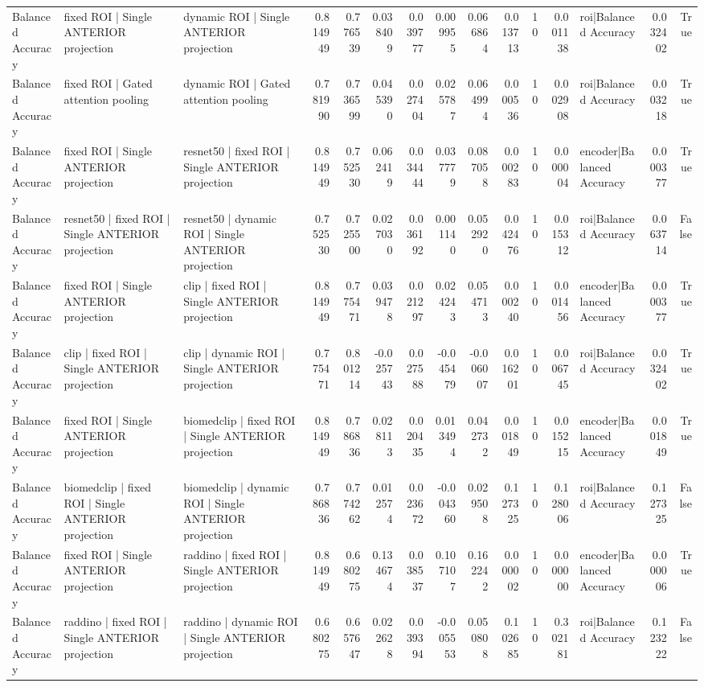 \begin{table}
\begin{tabular}{lllrrrrrrrrrlrr}
Balanced Accuracy & fixed ROI | Single ANTERIOR projection & dynamic ROI | Single ANTERIOR projection & 0.814949 & 0.776539 & 0.038409 & 0.039777 & 0.009955 & 0.066864 & 0.013713 & 10 & 0.001138 & roi|Balanced Accuracy & 0.032402 & True \\
Balanced Accuracy & fixed ROI | Gated attention pooling & dynamic ROI | Gated attention pooling & 0.781990 & 0.736599 & 0.045390 & 0.027404 & 0.025787 & 0.064994 & 0.000536 & 10 & 0.002908 & roi|Balanced Accuracy & 0.003218 & True \\
Balanced Accuracy & fixed ROI | Single ANTERIOR projection & resnet50 | fixed ROI | Single ANTERIOR projection & 0.814949 & 0.752530 & 0.062419 & 0.034444 & 0.037779 & 0.087058 & 0.000283 & 10 & 0.000004 & encoder|Balanced Accuracy & 0.000377 & True \\
Balanced Accuracy & resnet50 | fixed ROI | Single ANTERIOR projection & resnet50 | dynamic ROI | Single ANTERIOR projection & 0.752530 & 0.725500 & 0.027030 & 0.036192 & 0.001140 & 0.052920 & 0.042476 & 10 & 0.015312 & roi|Balanced Accuracy & 0.063714 & False \\
Balanced Accuracy & fixed ROI | Single ANTERIOR projection & clip | fixed ROI | Single ANTERIOR projection & 0.814949 & 0.775471 & 0.039478 & 0.021297 & 0.024243 & 0.054713 & 0.000240 & 10 & 0.001456 & encoder|Balanced Accuracy & 0.000377 & True \\
Balanced Accuracy & clip | fixed ROI | Single ANTERIOR projection & clip | dynamic ROI | Single ANTERIOR projection & 0.775471 & 0.801214 & -0.025743 & 0.027588 & -0.045479 & -0.006007 & 0.016201 & 10 & 0.006745 & roi|Balanced Accuracy & 0.032402 & True \\
Balanced Accuracy & fixed ROI | Single ANTERIOR projection & biomedclip | fixed ROI | Single ANTERIOR projection & 0.814949 & 0.786836 & 0.028113 & 0.020435 & 0.013494 & 0.042732 & 0.001849 & 10 & 0.015215 & encoder|Balanced Accuracy & 0.001849 & True \\
Balanced Accuracy & biomedclip | fixed ROI | Single ANTERIOR projection & biomedclip | dynamic ROI | Single ANTERIOR projection & 0.786836 & 0.774262 & 0.012574 & 0.023672 & -0.004360 & 0.029508 & 0.127325 & 10 & 0.128006 & roi|Balanced Accuracy & 0.127325 & False \\
Balanced Accuracy & fixed ROI | Single ANTERIOR projection & raddino | fixed ROI | Single ANTERIOR projection & 0.814949 & 0.680275 & 0.134674 & 0.038537 & 0.107107 & 0.162242 & 0.000002 & 10 & 0.000000 & encoder|Balanced Accuracy & 0.000006 & True \\
Balanced Accuracy & raddino | fixed ROI | Single ANTERIOR projection & raddino | dynamic ROI | Single ANTERIOR projection & 0.680275 & 0.657647 & 0.022628 & 0.039394 & -0.005553 & 0.050808 & 0.102685 & 10 & 0.302181 & roi|Balanced Accuracy & 0.123222 & False \\
\bottomrule
\end{tabular}
\end{table}
